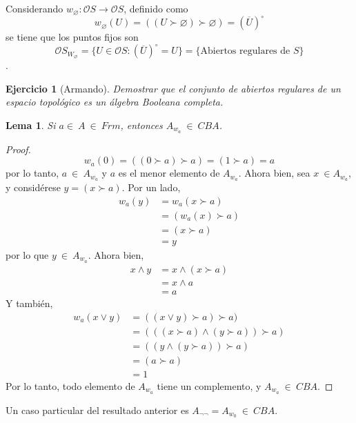 \documentclass[12pt,letterpaper,titlepage]{article}
\let\emptyset\varnothing
\newtheorem{exe}{Ejercicio}
\newtheorem*{lemma}{Lema}
\theoremstyle{definition}
\renewcommand\sup{\vee}
\renewcommand\inf{\wedge}
\renewcommand\cal[1]{\mathcal{#1}}
\newcommand\<{\langle}
\renewcommand\>{\rangle}
\begin{document}
Considerando $w_{\emptyset}:\cal O S\to \cal O S$, definido como 
$$w_{\emptyset}(U)=((U\succ\emptyset)\succ\emptyset)=(\overline{U})^{\circ}$$
se tiene que los puntos fijos son 
$$\cal O S_{W_{\emptyset}}=\{U\in \cal O S : (\overline{U})^{\circ}=U\}=\{\text{Abiertos regulares de }S\}$$.
\begin{exe}[Armando]
Demostrar que el conjunto de abiertos regulares de un espacio topológico es un álgebra Booleana completa.
\end{exe}
\begin{lemma}
Si $a\in \ A \ \in \ Frm$, entonces $A_{w_a} \ \in \ CBA$.
\end{lemma}
\begin{proof}
$$w_a(0)=((0\succ a)\succ a)=(1\succ a)=a$$
por lo tanto, $a \ \in \ A_{w_a}$ y $a$ es el menor elemento de $A_{w_a}$. Ahora bien, sea $x \ \in A_{w_a}$, y considérese $y=(x\succ a)$. Por un lado, 
\begin{align*}
    w_a(y) & =w_a(x\succ a)\\
    &=(w_a(x)\succ a)\\
    &=(x\succ a)\\
    &=y
\end{align*}
por lo que $y \ \in \ A_{w_a}$. Ahora bien, 
\begin{align*}
    x\inf y&=x\inf(x\succ a)\\
    &=x\inf a\\
    &=a
\end{align*}
Y también, 
\begin{align*}
    w_a(x\sup y)&=((x\sup y)\succ a)\succ a)\\
    &=(((x\succ a)\inf(y\succ a))\succ a)\\
    &=((y\inf(y\succ a))\succ a)\\
    &=(a\succ a)\\
    &=1
\end{align*}
Por lo tanto, todo elemento de $A_{w_a}$ tiene un complemento, y $A_{w_a} \ \in \ CBA$.
\end{proof}
Un caso particular del resultado anterior es $A_{\neg \neg}=A_{w_0} \ \in \ CBA$.
\end{document}

